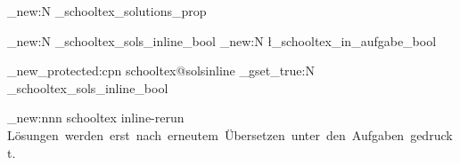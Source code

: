 
\makeatother


\newcommand{\teilaufgabe}[1]{\setlength{\parskip}{0.3em}\begin{addmargin}[1em]{0em}  \parbox[t]{0.6cm}{\textbf{\alph{TA})}}\refstepcounter{TA}\parbox[t]{0.9\linewidth}{#1}\end{addmargin} }
   

\ExplSyntaxOn

\prop_new:N \g_schooltex_solutions_prop

\bool_new:N \g_schooltex_sols_inline_bool
\bool_new:N \l_schooltex_in_aufgabe_bool

\cs_new_protected:cpn { schooltex@solsinline }
  { \bool_gset_true:N \g_schooltex_sols_inline_bool }

\msg_new:nnn { schooltex } { inline-rerun }
  { Lösungen~werden~erst~nach~erneutem~Übersetzen~unter~den~Aufgaben~gedruckt. }

